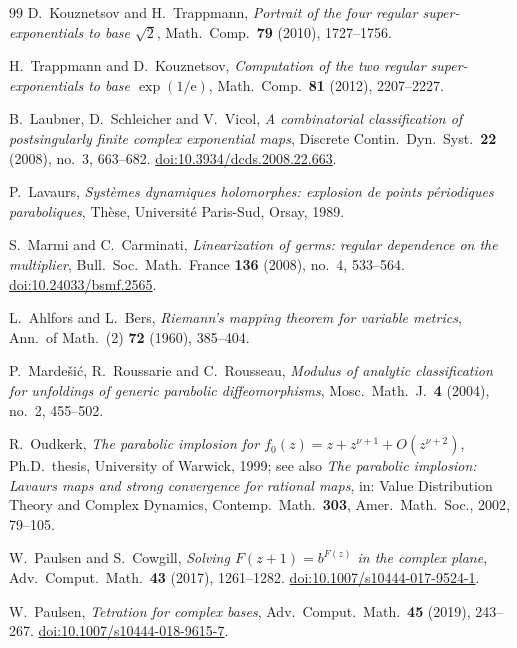 \documentclass[11pt,a4paper]{article}
\theoremstyle{definition}
\newcommand{\eee}{\mathrm{e}}
\begin{document}
\begin{thebibliography}{99}
D.~Kouznetsov and H.~Trappmann,
\emph{Portrait of the four regular super-exponentials to base $\sqrt2$},
Math.\ Comp.\ \textbf{79} (2010), 1727--1756.

H.~Trappmann and D.~Kouznetsov,
\emph{Computation of the two regular super-exponentials to base
$\exp(1/\eee)$},
Math.\ Comp.\ \textbf{81} (2012), 2207--2227.

B.~Laubner, D.~Schleicher and V.~Vicol,
\emph{A combinatorial classification of postsingularly finite complex
exponential maps},
Discrete Contin.\ Dyn.\ Syst.\ \textbf{22} (2008), no.~3, 663--682.
\href{https://doi.org/10.3934/dcds.2008.22.663}{doi:10.3934/dcds.2008.22.663}.

P.~Lavaurs,
\emph{Syst\`emes dynamiques holomorphes: explosion de points p\'eriodiques
paraboliques}, Th\`ese, Universit\'e Paris-Sud, Orsay, 1989.

S.~Marmi and C.~Carminati,
\emph{Linearization of germs: regular dependence on the multiplier},
Bull.\ Soc.\ Math.\ France \textbf{136} (2008), no.~4, 533--564.
\href{https://doi.org/10.24033/bsmf.2565}{doi:10.24033/bsmf.2565}.

L.~Ahlfors and L.~Bers,
\emph{Riemann's mapping theorem for variable metrics},
Ann.\ of Math.\ (2) \textbf{72} (1960), 385--404.

P.~Marde\v{s}i\'c, R.~Roussarie and C.~Rousseau,
\emph{Modulus of analytic classification for unfoldings of generic parabolic
diffeomorphisms},
Mosc.\ Math.\ J.\ \textbf{4} (2004), no.~2, 455--502.

R.~Oudkerk,
\emph{The parabolic implosion for
$f_0(z)=z+z^{\nu+1}+O(z^{\nu+2})$},
Ph.D.\ thesis, University of Warwick, 1999;
see also \emph{The parabolic implosion: Lavaurs maps and strong convergence for
rational maps}, in: Value Distribution Theory and Complex Dynamics,
Contemp.\ Math.\ \textbf{303}, Amer.\ Math.\ Soc., 2002, 79--105.

W.~Paulsen and S.~Cowgill,
\emph{Solving $F(z+1)=b^{F(z)}$ in the complex plane},
Adv.\ Comput.\ Math.\ \textbf{43} (2017), 1261--1282.
\href{https://doi.org/10.1007/s10444-017-9524-1}{doi:10.1007/s10444-017-9524-1}.

W.~Paulsen,
\emph{Tetration for complex bases},
Adv.\ Comput.\ Math.\ \textbf{45} (2019), 243--267.
\href{https://doi.org/10.1007/s10444-018-9615-7}{doi:10.1007/s10444-018-9615-7}.


\end{thebibliography}
\end{document}
